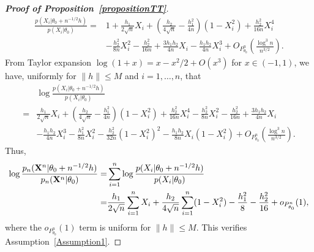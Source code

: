 \documentclass[11pt]{article}
\theoremstyle{plain}
\theoremstyle{definition}
\theoremstyle{remark}
\begin{document}
\begin{appendices}
\begin{proof}[\textbf{Proof of Proposition~\ref{propositionTT}}]
\begin{equation*}
    \begin{split}
    \frac{p(X_i|\theta_0+n^{-1/2}h)}{p(X_i|\theta_0)}
    =&
1
+\frac{h_1}{2\sqrt{n}} X_i
+\left(\frac{h_2}{4\sqrt{n}}-\frac{h_1^2}{4n}\right)
        (1-X_i^2)
    +\frac{h_2^2}{16n}X_i^4 
    \\
    &-\frac{h_2^2}{8n}X_i^2
-\frac{h_2^2}{16n}
+\frac{3 h_1 h_2}{4 n}  X_i
     -\frac{h_1 h_2}{4 n}X_i^3
     +O_{P^n_{\theta_0}}\left(\frac{\log^3 n}{n^{3/2}}\right).
    \end{split}
\end{equation*}
From Taylor expansion $\log(1+x)=x-x^2/2+O(x^3)$ for $x\in(-1,1)$, we have, uniformly for $\|h\|\leq M$ and $i=1,\ldots,n$, that
\begin{equation*}
    \begin{split}
    &\log \frac{p(X_i|\theta_0+n^{-1/2}h)}{p(X_i|\theta_0)}
    \\
    =&
\frac{h_1}{2\sqrt{n}} X_i
+\left(\frac{h_2}{4\sqrt{n}}-\frac{h_1^2}{4n}\right)
        (1-X_i^2)
    +\frac{h_2^2}{16n}X_i^4 
    -\frac{h_2^2}{8n}X_i^2
-\frac{h_2^2}{16n}
+\frac{3 h_1 h_2}{4 n}  X_i
\\
     &-\frac{h_1 h_2}{4 n}X_i^3
     -\frac{h_1^2}{8n}X_i^2
     -\frac{h_2^2}{32n}(1-X_i^2)^2
     -\frac{h_1 h_2}{8n}X_i(1-X_i^2)
     +O_{P^n_{\theta_0}}\left(\frac{\log^3 n}{n^{3/2}}\right).
    \end{split}
\end{equation*}
Thus,
\begin{equation*}
    \begin{split}
        \log 
        \frac{p_n(\mathbf{X}^{n}|\theta_0+n^{-1/2}h)}{p_n(\mathbf{X}^{n}|\theta_0)}=&
        \sum_{i=1}^n\log \frac{p(X_i|\theta_0+n^{-1/2}h)}{p(X_i|\theta_0)}
    \\
    =&
    \frac{h_1}{2\sqrt{n}} \sum_{i=1}^n X_i
+
\frac{h_2}{4\sqrt{n}} \sum_{i=1}^n (1-X_i^2)
     -\frac{h_1^2}{8}
     -\frac{h_2^2}{16}
     +o_{P^n_{\theta_0}}(1),
    \end{split}
\end{equation*}
where the $o_{P^n_{\theta_0}}(1)$ term is uniform for $\|h\|\leq M$.
This verifies Assumption~\ref{Assumption1}.


\end{proof}
\end{appendices}
\end{document}
